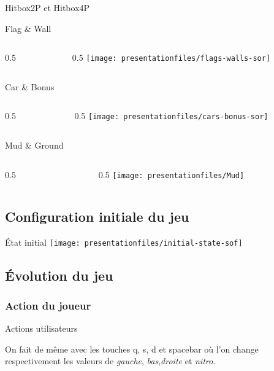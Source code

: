 \documentclass[10pt,dvipsnames,final]{beamer}
\newcommand{\midcolumn}[2]{
\begin{columns}
	\begin{column}{0.5\textwidth}
		#1
	\end{column}
	\begin{column}{0.5\textwidth}
		#2
	\end{column}
\end{columns}
}
\begin{document}
\begin{frame}{Hitbox2P et Hitbox4P}


\end{frame}

\begin{frame}{Flag \& Wall}
\midcolumn{}{\texttt{[image: presentationfiles/flags-walls-sor]}}
\end{frame}

\begin{frame}{Car \& Bonus}
\midcolumn{}{\texttt{[image: presentationfiles/cars-bonus-sor]}}
\end{frame}

\begin{frame}{Mud \& Ground}
\midcolumn{}{\texttt{[image: presentationfiles/Mud]}}
\end{frame}

\subsection{Configuration initiale du jeu}

\begin{frame}{État initial}
\texttt{[image: presentationfiles/initial-state-sof]} 
\end{frame}

\subsection{Évolution du jeu}

\subsubsection{Action du joueur}

\begin{frame}{Actions utilisateurs}


On fait de même avec les touches q, s, d et spacebar où l'on change respectivement les valeurs de \emph{gauche}, \emph{bas},\emph{droite} et \emph{nitro}.


\end{frame}
\end{document}
